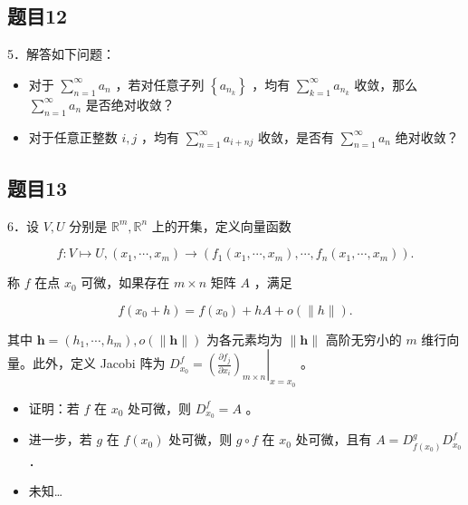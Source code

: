 \documentclass{article}
\begin{document}
\subsection{题目12}
5．解答如下问题：

\begin{itemize}
  \item[（1）] 对于 \(\sum_{n=1}^{\infty} a_{n}\) ，若对任意子列 \(\left\{a_{n_{k}}\right\}\) ，均有 \(\sum_{k=1}^{\infty} a_{n_{k}}\) 收敛，那么 \(\sum_{n=1}^{\infty} a_{n}\) 是否绝对收敛？
  \item[（2）] 对于任意正整数 \(i, j\) ，均有 \(\sum_{n=1}^{\infty} a_{i+n j}\) 收敛，是否有 \(\sum_{n=1}^{\infty} a_{n}\) 绝对收敛？
\end{itemize}

\subsection{题目13}
6．设 \(V, U\) 分别是 \(\mathbb{R}^{m}, \mathbb{R}^{n}\) 上的开集，定义向量函数

\[
f: V \mapsto U,\left(x_{1}, \cdots, x_{m}\right) \rightarrow\left(f_{1}\left(x_{1}, \cdots, x_{m}\right), \cdots, f_{n}\left(x_{1}, \cdots, x_{m}\right)\right) .
\]

称 \(f\) 在点 \(x_{0}\) 可微，如果存在 \(m \times n\) 矩阵 \(A\) ，满足

\[
f\left(x_{0}+h\right)=f\left(x_{0}\right)+h A+o(\|h\|) .
\]

其中 \(\mathbf{h}=\left(h_{1}, \cdots, h_{m}\right), o(\|\mathbf{h}\|)\) 为各元素均为 \(\|\mathbf{h}\|\) 高阶无穷小的 \(m\) 维行向量。此外，定义 Jacobi 阵为 \(D_{x_{0}}^{f}=\left.\left(\frac{\partial f_{j}}{\partial x_{i}}\right)_{m \times n}\right|_{x=x_{0}}\) 。

\begin{itemize}
  \item[（1）] 证明：若 \(f\) 在 \(x_{0}\) 处可微，则 \(D_{x_{0}}^{f}=A\) 。
  \item[（2）] 进一步，若 \(g\) 在 \(f\left(x_{0}\right)\) 处可微，则 \(g \circ f\) 在 \(x_{0}\) 处可微，且有 \(A=D_{f\left(x_{0}\right)}^{g} D_{x_{0}}^{f}\) ．
  \item[（3）] 未知…
\end{itemize}
\end{document}
